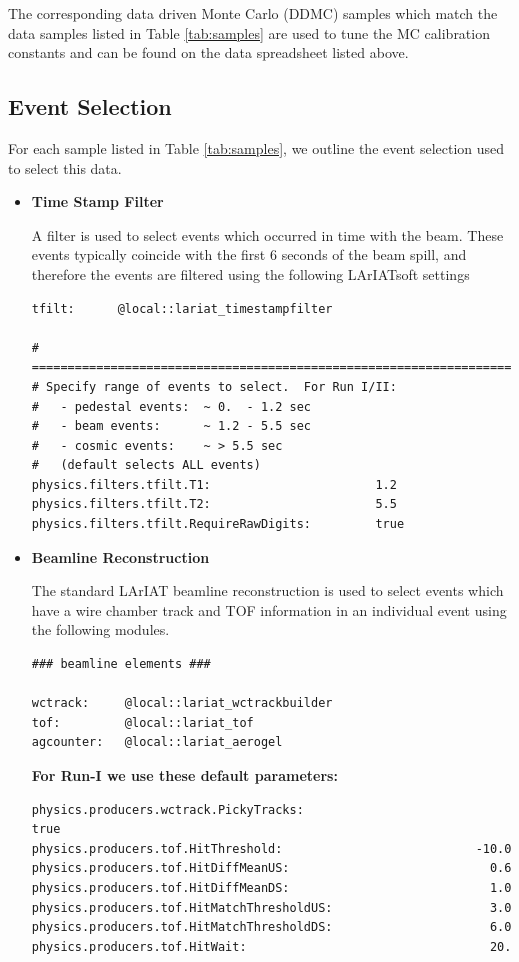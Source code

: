 The corresponding data driven Monte Carlo (DDMC) samples which match the data samples listed in Table \ref{tab:samples} are used to tune the MC calibration constants and can be found on the data spreadsheet listed above.


\subsection{Event Selection}\label{sec:EventSelection}
For each sample listed in Table \ref{tab:samples}, we outline the event selection used to select this data.

\begin{itemize}
\item \textbf{Time Stamp Filter}

A filter is used to select events which occurred in time with the beam. These events typically coincide with the first 6 seconds of the beam spill, and therefore the events are filtered using the following LArIATsoft settings

\begin{verbatim}
tfilt:      @local::lariat_timestampfilter

# ====================================================================
# Specify range of events to select.  For Run I/II:
#   - pedestal events:  ~ 0.  - 1.2 sec
#   - beam events:      ~ 1.2 - 5.5 sec
#   - cosmic events:    ~ > 5.5 sec
#   (default selects ALL events)
physics.filters.tfilt.T1:                       1.2
physics.filters.tfilt.T2:                       5.5
physics.filters.tfilt.RequireRawDigits:         true

\end{verbatim}



\item \textbf{Beamline Reconstruction}

The standard LArIAT beamline reconstruction is used to select events which have a wire chamber track and TOF information in an individual event using the following modules.
\begin{verbatim}
### beamline elements ###

wctrack:     @local::lariat_wctrackbuilder
tof:         @local::lariat_tof
agcounter:   @local::lariat_aerogel
\end{verbatim}


\textbf{For Run-I we use these default parameters:}
\begin{verbatim} 
physics.producers.wctrack.PickyTracks:                          true
physics.producers.tof.HitThreshold:                           -10.0  
physics.producers.tof.HitDiffMeanUS:                            0.6  
physics.producers.tof.HitDiffMeanDS:                            1.0  
physics.producers.tof.HitMatchThresholdUS:                      3.0  
physics.producers.tof.HitMatchThresholdDS:                      6.0  
physics.producers.tof.HitWait:                                  20.
\end{verbatim}


\end{itemize}
